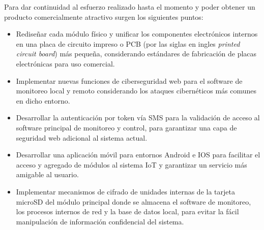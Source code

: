 Para dar continuidad al esfuerzo realizado hasta el momento y poder obtener un producto comercialmente atractivo surgen los siguientes puntos: 

\begin{itemize}

\item Rediseñar cada módulo físico y unificar los componentes electrónicos internos en una placa de circuito impreso o PCB (por las siglas en ingles \emph{printed circuit board}) más pequeña, considerando estándares de fabricación de placas electrónicas para uso comercial.


\item Implementar nuevas funciones de ciberseguridad web para el software de monitoreo local y remoto considerando los ataques cibernéticos más comunes en dicho entorno.

\item Desarrollar la autenticación por token vía SMS para la validación de acceso al software principal de monitoreo y control, para garantizar una capa de seguridad web adicional al sistema actual.

\item Desarrollar una aplicación móvil para entornos Android e IOS para facilitar el acceso y agregado de módulos al sistema IoT y garantizar un servicio más amigable al usuario.

\item Implementar mecanismos de cifrado de unidades internas de la tarjeta microSD del módulo principal donde se almacena el software de monitoreo, los procesos internos de red y la base de datos local, para evitar la fácil manipulación de información confidencial del sistema.
\end{itemize}

